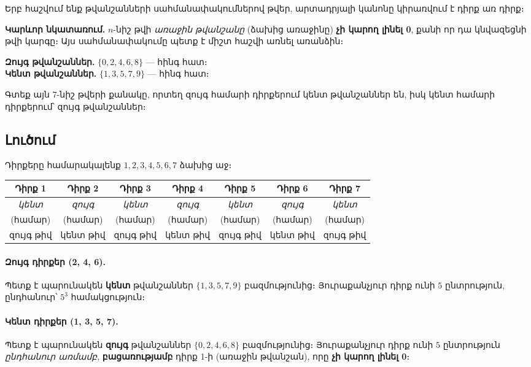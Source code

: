\documentclass[12pt, a4paper]{article}
\begin{document}
\begin{theorybox}
Երբ հաշվում ենք թվանշանների սահմանափակումներով թվեր, արտադրյալի կանոնը
կիրառվում է դիրք առ դիրք։

\medskip
\textbf{Կարևոր նկատառում.}\;
$n$-նիշ թվի \emph{առաջին թվանշանը} (ձախից առաջինը) \textbf{չի կարող լինել 0},
քանի որ դա կնվազեցնի թվի կարգը։ Այս սահմանափակումը պետք է միշտ հաշվի առնել առանձին։

\medskip
\textbf{Զույգ թվանշաններ.} $\{0, 2, 4, 6, 8\}$ — հինգ հատ։\\
\textbf{Կենտ թվանշաններ.} $\{1, 3, 5, 7, 9\}$ — հինգ հատ։
\end{theorybox}

\begin{problembox}
Գտեք այն 7-նիշ թվերի քանակը, որտեղ զույգ համարի դիրքերում կենտ թվանշաններ են,
իսկ կենտ համարի դիրքերում՝ զույգ թվանշաններ։
\end{problembox}

\subsection*{Լուծում}

Դիրքերը համարակալենք $1, 2, 3, 4, 5, 6, 7$ ձախից աջ։

\begin{center}
\renewcommand{\arraystretch}{1.4}
\begin{tabular}{ccccccc}
\toprule
Դիրք 1 & Դիրք 2 & Դիրք 3 & Դիրք 4 & Դիրք 5 & Դիրք 6 & Դիրք 7 \\
\midrule
\textit{կենտ} & \textit{զույգ} & \textit{կենտ} & \textit{զույգ} & \textit{կենտ} & \textit{զույգ} & \textit{կենտ} \\
(համար) & (համար) & (համար) & (համար) & (համար) & (համար) & (համար) \\
\midrule
զույգ թիվ & կենտ թիվ & զույգ թիվ & կենտ թիվ & զույգ թիվ & կենտ թիվ & զույգ թիվ \\
\bottomrule
\end{tabular}
\end{center}

\paragraph{Զույգ դիրքեր (2, 4, 6).}
Պետք է պարունակեն \textbf{կենտ} թվանշաններ $\{1, 3, 5, 7, 9\}$ բազմությունից։
Յուրաքանչյուր դիրք ունի $5$ ընտրություն, ընդհանուր՝ $5^3$ համակցություն։

\paragraph{Կենտ դիրքեր (1, 3, 5, 7).}
Պետք է պարունակեն \textbf{զույգ} թվանշաններ $\{0, 2, 4, 6, 8\}$ բազմությունից։
Յուրաքանչյուր դիրք ունի $5$ ընտրություն \emph{ընդհանուր առմամբ}, \textbf{բացառությամբ}
դիրք 1-ի (առաջին թվանշան), որը \textbf{չի կարող լինել 0}։
\end{document}
